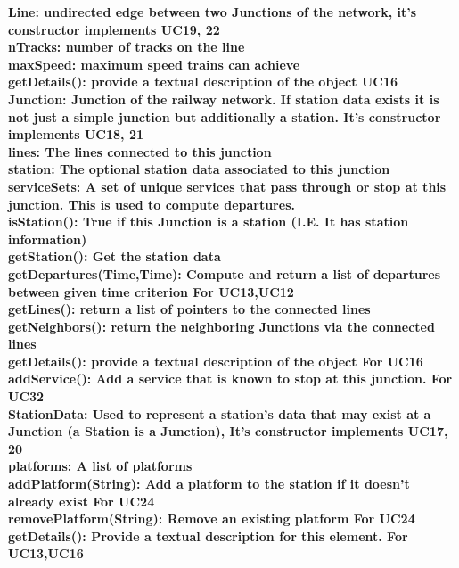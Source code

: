 \bf{Line}: undirected edge between two Junctions of the network, it's constructor implements UC19, 22\\

nTracks: number of tracks on the line\\
maxSpeed: maximum speed trains can achieve\\
getDetails(): provide a textual description of the object UC16\\

\bf{Junction}: Junction of the railway network. If station data exists it is not just a simple junction but additionally a station. It's constructor implements UC18, 21\\
 
lines: The lines connected to this junction\\
station: The optional station data associated to this junction\\
serviceSets: A set of unique services that pass through or stop at this junction. This is used to compute departures.\\
isStation(): True if this Junction is a station (I.E. It has station information)\\
getStation(): Get the station data\\
getDepartures(Time,Time): Compute and return a list of departures between given time criterion
For UC13,UC12\\
getLines(): return a list of pointers to the connected lines\\
getNeighbors(): return the neighboring Junctions via the connected lines\\
getDetails(): provide a textual description of the object
For UC16\\
addService(): Add a service that is known to stop at this junction.
For UC32\\

\bf{StationData}: Used to represent a station's data that may exist at a Junction (a Station is a Junction), It's constructor implements UC17, 20\\

platforms: A list of platforms\\
addPlatform(String):  Add a platform to the station if it doesn't already exist
For UC24\\
removePlatform(String): Remove an existing platform
For UC24\\
getDetails(): Provide a textual description for this element.
For UC13,UC16\\

